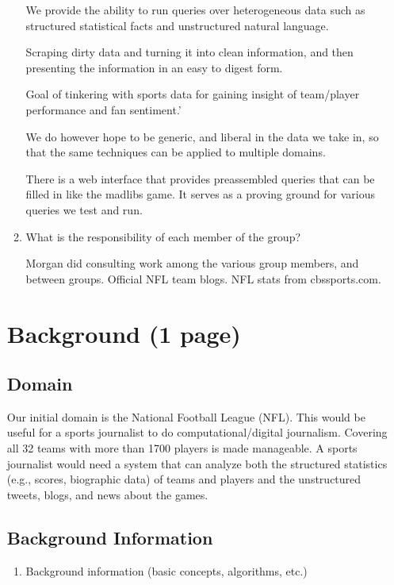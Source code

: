 \documentclass{article}
\begin{document}
\begin{enumerate}
\begin{enumerate}
    We provide the ability to run queries over heterogeneous data such as structured statistical facts and unstructured natural language.

    Scraping dirty data and turning it into clean information, and then presenting the information in an easy to digest form.


    Goal of tinkering with sports data for gaining insight of team/player performance and fan sentiment.'

    We do however hope to be generic, and liberal in the data we take in, so that the same techniques can be applied to multiple domains.

    There is a web interface that provides preassembled queries that can be filled in like the madlibs game.
    It serves as a proving ground for various queries we test and run.

  \item What is the responsibility of each member of the group?



    Morgan did consulting work among the various group members, and between groups.
    Official NFL team blogs. NFL stats from cbssports.com.
  \end{enumerate}

  \section{Background (1 page)}
  \subsection{Domain}

  Our initial domain is the National Football League (NFL).
  This would be useful for a sports journalist to do computational/digital journalism.
  Covering all 32 teams with more than 1700 players is made manageable.
  A sports journalist would need a system
  that can analyze both the
  structured statistics (e.g., scores, biographic data) of teams and players and the
  unstructured tweets, blogs, and news about the games.



  \subsection{Background Information}
  \begin{enumerate}
  \item Background information (basic concepts, algorithms, etc.)




\end{enumerate}
\end{enumerate}
\end{document}
